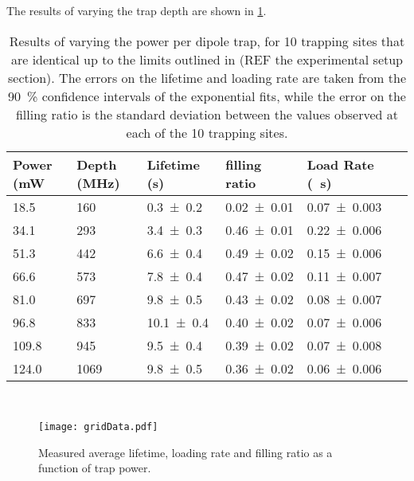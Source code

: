 \documentclass[../Thesis-IJspeert.tex]{subfiles}
\begin{document}

The results of varying the trap depth are shown in \cref{table:depthSweep}. 

\begin{table}[]
	\centering
	\begin{tabular}{llllll} \toprule
		Power (\si{\milli\watt}}{unit commands}) & Depth (\si{\mega\hertz}) & Lifetime (\si{\second}) & filling ratio & Load Rate (\si{\per\second}) \\ \midrule
		18.5 & 160 & \num{0.3 \pm 0.2} & \num{0.02 \pm 0.01} & \num{0.07 \pm 0.003} \\ 
		34.1 & 293 & \num{3.4 \pm 0.3} & \num{0.46 \pm 0.01} & \num{0.22 \pm 0.006} \\ 
		51.3 & 442 & \num{6.6 \pm 0.4} & \num{0.49 \pm 0.02} & \num{0.15 \pm 0.006} \\ 
		66.6 & 573 & \num{7.8 \pm 0.4} & \num{0.47 \pm 0.02} & \num{0.11 \pm 0.007} \\ 
		81.0 & 697 & \num{9.8 \pm 0.5} & \num{0.43 \pm 0.02} & \num{0.08 \pm 0.007} \\ 
		96.8 & 833 & \num{10.1 \pm 0.4} & \num{0.40 \pm 0.02} & \num{0.07 \pm 0.006} \\ 
		109.8 & 945 & \num{9.5 \pm 0.4} & \num{0.39 \pm 0.02} & \num{0.07 \pm 0.008} \\ 
		124.0 & 1069 & \num{9.8 \pm 0.5} & \num{0.36 \pm 0.02} & \num{0.06 \pm 0.006}  \\ \bottomrule
	\end{tabular} \\
	\caption{Results of varying the power per dipole trap, for \num{10} trapping sites that are identical up to the limits outlined in (REF the experimental setup section). The errors on the lifetime and loading rate are taken from the \SI{90}{\percent} confidence intervals of the exponential fits, while the error on the filling ratio is the standard deviation between the values observed at each of the \num{10} trapping sites.}
	\label{table:depthSweep}
\end{table}

\begin{figure}[tb]
	\centering
	\texttt{[image: gridData.pdf]}
	\caption{Measured average lifetime, loading rate and filling ratio as a function of trap power.}
	\label{fig:gridData}
\end{figure}
\end{document}
